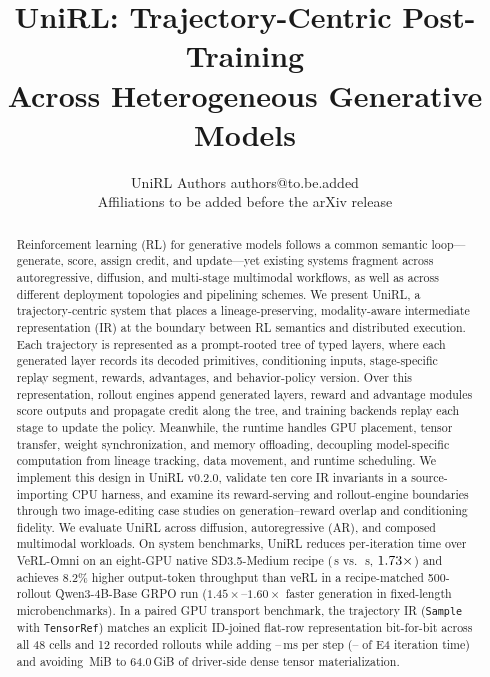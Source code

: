 \documentclass[10pt]{article}
\title{UniRL: Trajectory-Centric Post-Training\\
Across Heterogeneous Generative Models}
\author{\name UniRL Authors \email authors@to.be.added \\
      \addr Affiliations to be added before the arXiv release}
\newcommand{\system}{UniRL\xspace}
\newcommand{\sample}{\texttt{Sample}}
\begin{document}
\raggedbottom

\maketitle

\begin{abstract}
Reinforcement learning (RL) for generative models follows a common semantic loop---generate, score, assign credit, and update---yet existing systems fragment across autoregressive, diffusion, and multi-stage multimodal workflows, as well as across different deployment topologies and pipelining schemes.
We present UniRL, a trajectory-centric system that places a lineage-preserving, modality-aware intermediate representation (IR) at the boundary between RL semantics and distributed execution.
Each trajectory is represented as a prompt-rooted tree of typed layers, where each generated layer records its decoded primitives, conditioning inputs, stage-specific replay segment, rewards, advantages, and behavior-policy version.
Over this representation, rollout engines append generated layers, reward and advantage modules score outputs and propagate credit along the tree, and training backends replay each stage to update the policy.
Meanwhile, the runtime handles GPU placement, tensor transfer, weight synchronization, and memory offloading, decoupling model-specific computation from lineage tracking, data movement, and runtime scheduling.
We implement this design in UniRL v0.2.0, validate ten core IR invariants in a source-importing CPU harness, and examine its reward-serving and rollout-engine boundaries through two image-editing case studies on generation--reward overlap and conditioning fidelity.
We evaluate \system across diffusion, autoregressive (AR), and composed multimodal workloads.
On system benchmarks, \system reduces per-iteration time over VeRL-Omni on an eight-GPU native SD3.5-Medium recipe (\ReportedUniRLSeconds{}\,s vs.\ \ReportedSDPASeconds{}\,s, $1.73{}\times$) and achieves 8.2\% higher output-token throughput than veRL in a recipe-matched 500-rollout Qwen3-4B-Base GRPO run ($1.45\times$--$1.60\times$ faster generation in fixed-length microbenchmarks).
In a paired GPU transport benchmark, the trajectory IR (\sample{} with \texttt{TensorRef}) matches an explicit ID-joined flat-row representation bit-for-bit across all 48 cells and 12 recorded rollouts while adding \EFiveRTreeEExactSameTotalMs{}--\EFiveRTreeEExactCrossTotalMs{}\,ms per step (\EFiveRTreeEExactPctSixtyFour{}--\EFiveRTreeEExactCrossPctTwentyNine{} of E4 iteration time) and avoiding \EFiveRTreeEExactAvoidedMiB{}\,MiB to 64.0\,GiB of driver-side dense tensor materialization.

\end{abstract}
\end{document}
